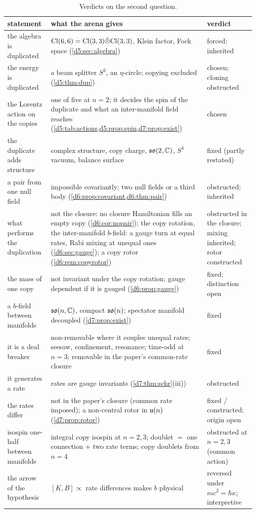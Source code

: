 \begin{table}[t]
\centering
\small
\begin{tabular}{@{}>{\raggedright\arraybackslash}p{4.2cm}>{\raggedright\arraybackslash}p{6.6cm}>{\raggedright\arraybackslash}p{3.4cm}@{}}
\toprule
statement & what the arena gives & verdict\\
\midrule
the algebra is duplicated & $\mathrm{Cl}(6,6)=\mathrm{Cl}(3,3)\hat\otimes\mathrm{Cl}(3,3)$, Klein factor, Fock space (\cref{d5:sec:algebra}) & forced; inherited\\
the energy is duplicated & a beam splitter $S^3$, an $\eta$-circle; copying excluded (\cref{d5:thm:dup}) & chosen; cloning obstructed\\
the Lorentz action on the copies & one of five at $n=2$; it decides the spin of the duplicate and what an inter-manifold field reaches (\cref{d5:tab:actions,d5:prop:spin,d7:prop:exist}) & chosen\\
the duplicate adds structure & complex structure, copy charge, $\mathfrak{so}(2,\mathbb{C})$, $S^4$ vacuum, balance surface & fixed (partly restated)\\
a pair from one null field & impossible covariantly; two null fields or a third body (\cref{d6:prop:covariant,d6:thm:pair}) & obstructed; inherited\\
what performs the duplication & not the closure: no closure Hamiltonian fills an empty copy (\cref{d6:cor:nopair}); the copy rotation, the inter-manifold $b$-field: a gauge turn at equal rates, Rabi mixing at unequal ones (\cref{d6:sec:gauge}); a copy rotor (\cref{d6:rem:copyrotor}) & obstructed in the closure; mixing inherited; rotor constructed\\
the mass of one copy & not invariant under the copy rotation; gauge dependent if it is gauged (\cref{d6:prop:gauge}) & fixed; distinction open\\
a $b$-field between manifolds & $\mathfrak{so}(n,\mathbb{C})$, compact $\mathfrak{so}(n)$; spectator manifold decoupled (\cref{d7:prop:exist}) & fixed\\
it is a deal breaker & non-removable where it couples unequal rates; seesaw, confinement, resonance; time-odd at $n=3$; removable in the paper's common-rate closure & fixed\\
it generates a rate & rates are gauge invariants (\cref{d7:thm:schr}(iii)) & obstructed\\
the rates differ & not in the paper's closure (common rate imposed); a non-central rotor in $\mathfrak{u}(n)$ (\cref{d7:prop:rotor}) & fixed / constructed; origin open\\
isospin one-half between manifolds & integral copy isospin at $n=2,3$; doublet $=$ one connection $+$ two rate terms; copy doublets from $n=4$ & obstructed at $n=2,3$ (common action)\\
the arrow of the hypothesis & $[K,B]\propto$ rate differences makes $b$ physical & reversed under $mc^2=\hbar\kappa$; interpretive\\
\bottomrule
\end{tabular}
\caption{Verdicts on the second question.}
\label{s6:tab:verdict}
\end{table}
